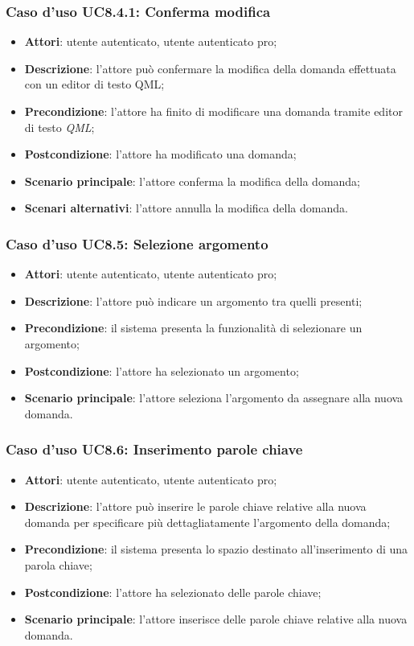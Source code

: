 		\subsubsection{Caso d'uso UC8.4.1: Conferma modifica}
		\begin{itemize}
			\item
			\textbf{Attori}: utente autenticato, utente autenticato pro;
			\item
			\textbf{Descrizione}: l'attore può confermare la modifica della domanda effettuata con un editor di testo QML;
			\item		
			\textbf{Precondizione}: l'attore ha finito di modificare una domanda tramite editor di testo \textit{QML};
			\item
			\textbf{Postcondizione}: l'attore ha modificato una domanda;
			\item
			\textbf{Scenario principale}: l'attore conferma la modifica della domanda;		
			\item
			\textbf{Scenari alternativi}: l'attore annulla la modifica della domanda.
		\end{itemize}
		
	\subsubsection{Caso d'uso UC8.5: Selezione argomento}
	\begin{itemize}
		\item
		\textbf{Attori}: utente autenticato, utente autenticato pro;
		\item
		\textbf{Descrizione}: l'attore può indicare un argomento tra quelli presenti;
		\item		
		\textbf{Precondizione}: il sistema presenta la funzionalità di selezionare un argomento;
		\item
		\textbf{Postcondizione}: l'attore ha selezionato un argomento;
		\item
		\textbf{Scenario principale}: l'attore seleziona l'argomento da assegnare alla nuova domanda.		
	\end{itemize}
	
	\subsubsection{Caso d'uso UC8.6: Inserimento parole chiave}
	\begin{itemize}
		\item
		\textbf{Attori}: utente autenticato, utente autenticato pro;
		\item
		\textbf{Descrizione}: l'attore può inserire le parole chiave relative alla nuova domanda per specificare più dettagliatamente l'argomento della domanda;
		\item		
		\textbf{Precondizione}: il sistema presenta lo spazio destinato all'inserimento di una parola chiave;
		\item
		\textbf{Postcondizione}: l'attore ha selezionato delle parole chiave;
		\item
		\textbf{Scenario principale}: l'attore inserisce delle parole chiave relative alla nuova domanda.	
	\end{itemize}
	
